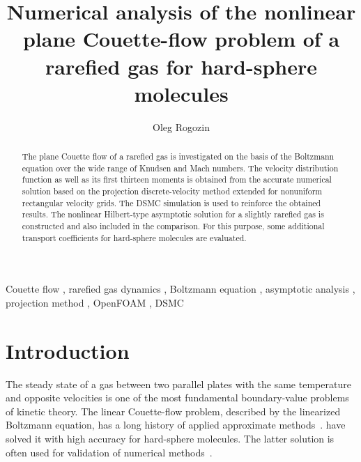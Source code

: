 \documentclass[review]{elsarticle}
\begin{document}
\begin{frontmatter}

\title{
    Numerical analysis of the nonlinear plane Couette-flow problem of a rarefied gas for hard-sphere molecules
}

\author{Oleg Rogozin}
\address{
    Moscow Institute of Physics and Technology,
    9 Institutskiy pereulok, Dolgoprudny,
    Moskovskaya obl., Russian Federation
}

\begin{keyword}
   Couette flow \sep
   rarefied gas dynamics \sep
   Boltzmann equation \sep
   asymptotic analysis \sep
   projection method \sep
   OpenFOAM \sep
   DSMC
\end{keyword}


\begin{abstract}
    The plane Couette flow of a rarefied gas is investigated on the basis of the Boltzmann equation
    over the wide range of Knudsen and Mach numbers.
    The velocity distribution function as well as its first thirteen moments is obtained from
    the accurate numerical solution based on the projection discrete-velocity method
    extended for nonuniform rectangular velocity grids.
    The DSMC simulation is used to reinforce the obtained results.
    The nonlinear Hilbert-type asymptotic solution for a slightly rarefied gas
    is constructed and also included in the comparison.
    For this purpose, some additional transport coefficients for hard-sphere molecules are evaluated.
\end{abstract}

\end{frontmatter}

\linenumbers

\section{Introduction}

The steady state of a gas between two parallel plates with the same temperature
and opposite velocities is one of the most fundamental boundary-value problems of kinetic theory.
The linear Couette-flow problem, described by the linearized Boltzmann equation,
has a long history of applied approximate methods~\citep{Willis1962}.
\citet{Ohwada1990} have solved it with high accuracy for hard-sphere molecules.
The latter solution is often used for validation of numerical methods~\citep[see e.g.][]{Fan2001,Aidun2010}.
\end{document}
